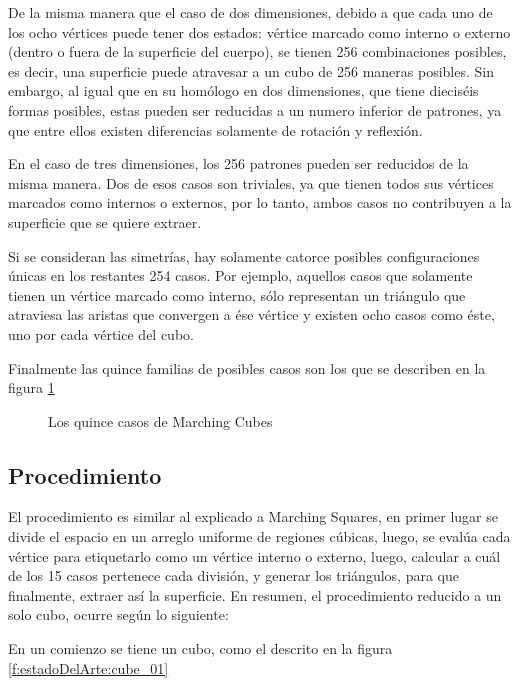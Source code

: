De la misma manera que el caso de dos dimensiones, debido a que cada uno de los ocho
vértices puede tener dos estados: vértice marcado como interno o externo (dentro o fuera de la
superficie del cuerpo), se tienen 256 combinaciones posibles, es decir, una superficie puede
atravesar a un cubo de 256 maneras posibles. Sin embargo, al igual que en su homólogo en dos
dimensiones, que tiene dieciséis formas posibles, estas pueden ser reducidas a un numero inferior
de patrones, ya que entre ellos existen diferencias solamente de rotación y reflexión.

En el caso de tres dimensiones, los 256 patrones pueden ser reducidos de la misma
manera. Dos de esos casos son triviales, ya que tienen todos sus vértices marcados como internos
o externos, por lo tanto, ambos casos no contribuyen a la superficie que se quiere extraer.

Si se consideran las simetrías, hay solamente catorce posibles configuraciones únicas en
los restantes 254 casos. Por ejemplo, aquellos casos que solamente tienen un vértice marcado
como interno, sólo representan un triángulo que atraviesa las aristas que convergen a ése vértice y
existen ocho casos como éste, uno por cada vértice del cubo.

Finalmente las quince familias de posibles casos son los que se describen en la figura \ref{f:estadoDelArte:MarchingCubes}

\begin{figure}[hbp]
\centering
\caption{Los quince casos de Marching Cubes}
\label{f:estadoDelArte:MarchingCubes}
\end{figure}

\subsection{Procedimiento}
\label{subsec:marchingCubes:procedimiento}

El procedimiento es similar al explicado a Marching Squares, en primer lugar se divide el
espacio en un arreglo uniforme de regiones cúbicas, luego, se evalúa cada vértice para etiquetarlo
como un vértice interno o externo, luego, calcular a cuál de los 15 casos pertenece cada división,
y generar los triángulos, para que finalmente, extraer así la superficie.
En resumen, el procedimiento reducido a un solo cubo, ocurre según lo siguiente:

En un comienzo se tiene un cubo, como el descrito en la figura \ref{f:estadoDelArte:cube_01}

